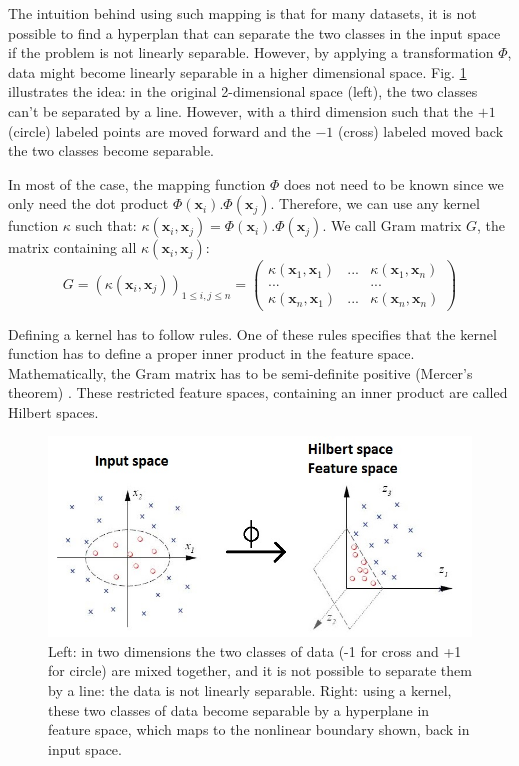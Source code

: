 The intuition behind using such mapping is that for many datasets, it is not possible to find a hyperplan that can separate the two classes in the input space if the problem is not linearly separable. However, by applying a transformation $\Phi$, data might become linearly separable in a higher dimensional space. Fig. \ref{fig:SVM_nonlinear} illustrates the idea: in the original 2-dimensional space (left), the two classes can't be separated by a line. However, with a third dimension such that the $+1$ (circle) labeled points are moved forward and the $-1$ (cross) labeled moved back the two classes become separable.

In most of the case, the mapping function $\Phi$ does not need to be known since we only need the dot product $\Phi(\textbf{x}_i) . \Phi(\textbf{x}_j)$. Therefore, we can use any kernel function $\kappa$ such that: $\kappa(\textbf{x}_i,\textbf{x}_j)= \Phi(\textbf{x}_i) . \Phi(\textbf{x}_j)$. We call Gram matrix $G$, the matrix containing all $\kappa(\textbf{x}_i,\textbf{x}_j)$:
\begin{equation*}
	G = (\kappa(\textbf{x}_i,\textbf{x}_j))_{1 \leq i,j \leq n} = 
	\begin{pmatrix}
	\kappa(\textbf{x}_1,\textbf{x}_1) & ... & \kappa(\textbf{x}_1,\textbf{x}_n) \\
	... & & ... \\
	\kappa(\textbf{x}_n,\textbf{x}_1) & ... & \kappa(\textbf{x}_n,\textbf{x}_n) 
	\end{pmatrix}
\end{equation*}

\noindent Defining a kernel has to follow rules. One of these rules specifies that the kernel function has to define a proper inner product in the feature space. Mathematically, the Gram matrix has to be semi-definite positive (Mercer's theorem) \cite{Schlkopf2013}. These restricted feature spaces, containing an inner product are called Hilbert spaces.


\begin{figure}[h!]
\centering
\includegraphics[width=0.9\linewidth]{images/SVM_nonlinear2}
\caption{Left: in two dimensions the two classes of data (-1 for cross and +1 for circle) are mixed together, and it is not possible to separate them by a line: the data is not linearly separable. Right: using a kernel, these two classes of data become separable by a hyperplane in feature space, which maps to the nonlinear boundary shown, back in input space.\protect\footnotemark}
\label{fig:SVM_nonlinear}
\end{figure}

